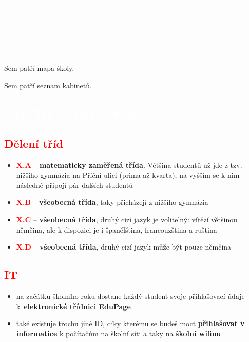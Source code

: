 \documentclass{article}
\newcommand{\nadpis}[1]{
  \begin{nadpisbox}
    \centering \section*{\textcolor{white}{#1}}
  \end{nadpisbox}
}
\newcommand{\podnadpis}[1]{
  \subsection*{\textcolor{red}{#1}}
}
\begin{document}
\begin{titlepage}
  \pagecolor{red}
    \begin{center}
      \vspace*{\fill}

      \textcolor{white}{\fontsize{60}{60} \Kapitan Průvodce\\\vspace{0.2em}prváka}

      \vspace*{\fill}
      \textcolor{white}{\fontsize{20}{20} \Kapitan Jaroška}

      \vspace{0.5em}

      \begin{bluebox}
        \centering \fontsize{15}{15} \Kapitan \textcolor{white}{2024/2025}
      \end{bluebox}

      \vspace{3em}

    \end{center}
\end{titlepage}
\pagecolor{white}


Sem patří mapa školy.
\newpage

Sem patří seznam kabinetů.
\newpage

\nadpis{JAK TO U NÁS CHODÍ}
\noindent \podnadpis{Dělení tříd}
\begin{itemize}[leftmargin=10pt]
  \item \textcolor{red}{\textbf{X.A}} --  \textbf{matematicky zaměřená třída}. Většina studentů už jde z tzv. nižšího gymnázia na Příční ulici (prima až kvarta), na vyšším se k nim následně připojí pár dalších studentů
  \item \textcolor{red}{\textbf{X.B}} -- \textbf{všeobecná třída}, taky přicházejí z nižšího gymnázia
  \item \textcolor{red}{\textbf{X.C}} -- \textbf{všeobecná třída}, druhý cizí jazyk je volitelný: vítězí většinou němčina, ale
k dispozici je i španělština, francouzština a ruština
  \item \textcolor{red}{\textbf{X.D}} -- \textbf{všeobecná třída}, druhý cizí jazyk může být pouze němčina
\end{itemize}
\podnadpis{IT}
\begin{itemize}[leftmargin=10pt]
  \item na začátku školního roku dostane každý student svoje přihlašovací údaje k~\textbf{elektronické třídnici EduPage}
  \item také existuje trochu jiné ID, díky kterému se budeš moct \textbf{přihlašovat v informatice} k počítačům na školní síti a taky na \textbf{školní wifinu}
\end{itemize}
\end{document}
